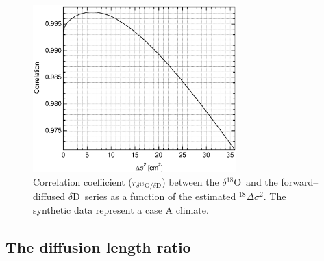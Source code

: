 \documentclass[11pt, draftcls, onecolumn]{IEEEtran} %
\numberwithin{equation}{section}
\numberwithin{table}{section}
\numberwithin{figure}{section}
\newcommand{\delOx}{$\delta{}^{18}\mathrm{O}$}
\newcommand{\delD}{$\delta\mathrm{D}$}
\newcommand{\delcorrel}{$r_{\delta{}^{18}\mathrm{O}/\delta\mathrm{D}}$}
\begin{document}
\begin{figure}[]	
	\vspace*{2mm}	
	\begin{center}		
		\includegraphics[width=0.7\textwidth]{Figure_8}		
		\caption{Correlation coefficient (\delcorrel) between the \delOx~and the forward--diffused \delD~series 
		as a function of the estimated ${}^{18}\Delta\sigma^2$.  
		The synthetic data represent a case A climate.} 		
		\label{fig:correlation_example}	
	\end{center}
\end{figure}


\subsection{The diffusion length ratio}
\end{document}
